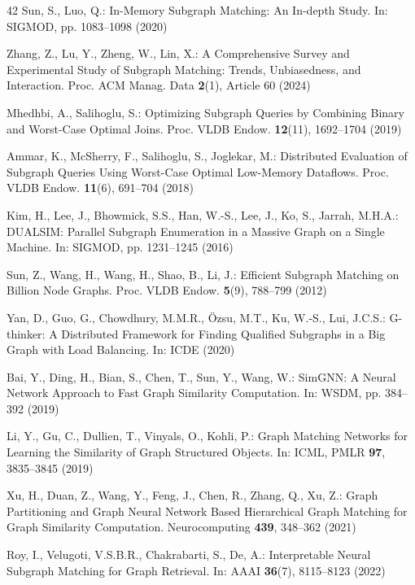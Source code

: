 \documentclass{article}
\begin{document}
{\begin{thebibliography}{42}
Sun, S., Luo, Q.: In-Memory Subgraph Matching: An In-depth Study. In: SIGMOD, pp. 1083--1098 (2020)

Zhang, Z., Lu, Y., Zheng, W., Lin, X.: A Comprehensive Survey and Experimental Study of Subgraph Matching: Trends, Unbiasedness, and Interaction. Proc. ACM Manag. Data \textbf{2}(1), Article 60 (2024)

Mhedhbi, A., Salihoglu, S.: Optimizing Subgraph Queries by Combining Binary and Worst-Case Optimal Joins. Proc. VLDB Endow. \textbf{12}(11), 1692--1704 (2019)

Ammar, K., McSherry, F., Salihoglu, S., Joglekar, M.: Distributed Evaluation of Subgraph Queries Using Worst-Case Optimal Low-Memory Dataflows. Proc. VLDB Endow. \textbf{11}(6), 691--704 (2018)

Kim, H., Lee, J., Bhowmick, S.S., Han, W.-S., Lee, J., Ko, S., Jarrah, M.H.A.: DUALSIM: Parallel Subgraph Enumeration in a Massive Graph on a Single Machine. In: SIGMOD, pp. 1231--1245 (2016)

Sun, Z., Wang, H., Wang, H., Shao, B., Li, J.: Efficient Subgraph Matching on Billion Node Graphs. Proc. VLDB Endow. \textbf{5}(9), 788--799 (2012)

Yan, D., Guo, G., Chowdhury, M.M.R., \"{O}zsu, M.T., Ku, W.-S., Lui, J.C.S.: G-thinker: A Distributed Framework for Finding Qualified Subgraphs in a Big Graph with Load Balancing. In: ICDE (2020)

Bai, Y., Ding, H., Bian, S., Chen, T., Sun, Y., Wang, W.: SimGNN: A Neural Network Approach to Fast Graph Similarity Computation. In: WSDM, pp. 384--392 (2019)

Li, Y., Gu, C., Dullien, T., Vinyals, O., Kohli, P.: Graph Matching Networks for Learning the Similarity of Graph Structured Objects. In: ICML, PMLR \textbf{97}, 3835--3845 (2019)

Xu, H., Duan, Z., Wang, Y., Feng, J., Chen, R., Zhang, Q., Xu, Z.: Graph Partitioning and Graph Neural Network Based Hierarchical Graph Matching for Graph Similarity Computation. Neurocomputing \textbf{439}, 348--362 (2021)

Roy, I., Velugoti, V.S.B.R., Chakrabarti, S., De, A.: Interpretable Neural Subgraph Matching for Graph Retrieval. In: AAAI \textbf{36}(7), 8115--8123 (2022)


\end{thebibliography}}
\end{document}

